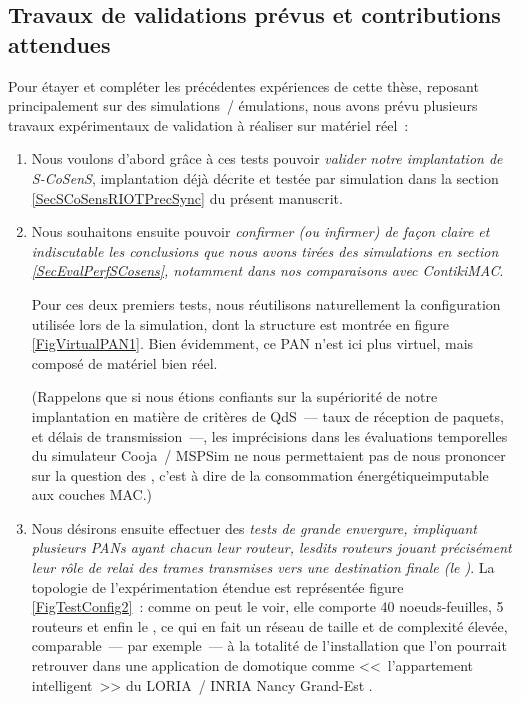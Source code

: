 \subsection{Travaux de validations prévus et contributions attendues}
\label{SubsecTravauxValidPrevus}

Pour étayer et compléter les précédentes expériences de cette thèse,
reposant principalement sur des simulations~/ émulations, nous avons prévu
plusieurs travaux expérimentaux de validation à réaliser sur matériel réel~:

\begin{enumerate}

\item Nous voulons d'abord grâce à ces tests pouvoir \emph{valider
notre implantation de S-CoSenS}, implantation déjà décrite et testée
par simulation dans la section \vref{SecSCoSensRIOTPrecSync} du présent
manuscrit.

\item Nous souhaitons ensuite pouvoir \emph{confirmer (ou infirmer) de façon
claire et indiscutable les conclusions que nous avons tirées des simulations
en section \vref{SecEvalPerfSCosens}, notamment dans nos comparaisons avec
ContikiMAC}.

Pour ces deux premiers tests, nous réutilisons naturellement
la configuration utilisée lors de la simulation, dont la structure est
montrée en figure \vref{FigVirtualPAN1}. Bien évidemment, ce PAN n'est ici
plus virtuel, mais composé de matériel bien réel.

(Rappelons que si nous étions confiants sur la supériorité de notre
implantation en matière de critères de QdS~--- taux de réception
de paquets, et délais de transmission~---, les imprécisions dans les
évaluations temporelles du simulateur Cooja~/ MSPSim ne nous permettaient
pas de nous prononcer sur la question des , c'est
à dire de la consommation énergétique\footnotemark[1] imputable
aux couches MAC.)

\item Nous désirons ensuite effectuer des \emph{tests de grande envergure,
impliquant plusieurs PANs ayant chacun leur routeur, lesdits routeurs
jouant précisément leur rôle de relai des trames transmises vers une
destination finale (le )}. La topologie de l'expérimentation
étendue est représentée figure \vref{FigTestConfig2}~: comme on peut
le voir, elle comporte 40 noeuds-feuilles, 5 routeurs et enfin le
, ce qui en fait un réseau de taille et de complexité élevée,
comparable~--- par exemple~--- à la totalité de l'installation que l'on
pourrait retrouver dans une application de domotique comme <<~l'appartement
intelligent~>> du LORIA~/ INRIA Nancy Grand-Est \cite{AppartIntelligent}.


\end{enumerate}
